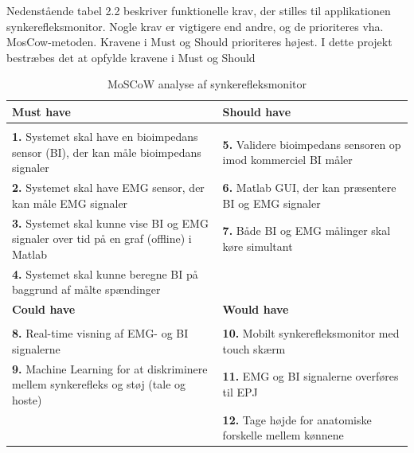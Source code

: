 Nedenstående tabel 2.2 beskriver funktionelle krav, der stilles til applikationen synkerefleksmonitor. Nogle krav er vigtigere end andre, og de prioriteres vha. MosCow-metoden. Kravene i Must og Should prioriteres højest. I dette projekt bestræbes det at opfylde kravene i Must og Should


\begin{table}[H]

\begin{tabularx}{\textwidth}{X|X}
\rowcolor{Gray}
\toprule
\textbf{Must have} & \textbf{Should have} \\
\hline \\
\textbf{1. }Systemet skal have en bioimpedans sensor (BI), der kan måle bioimpedans signaler & \textbf{5. }Validere bioimpedans sensoren op imod kommerciel BI måler \\[5ex]
\textbf{2. }Systemet skal have EMG sensor, der kan måle EMG signaler & \textbf{6. }Matlab GUI, der kan præsentere BI og EMG signaler \\[3ex]
\textbf{3. }Systemet skal kunne vise BI og EMG signaler over tid på en graf (offline) i Matlab  & \textbf{7. }Både BI og EMG målinger skal køre simultant\\[4ex]
\textbf{4. }Systemet skal kunne beregne BI på baggrund af målte spændinger & \\[4ex]


\midrule
    \rowcolor{Gray}
    \textbf{Could have} & \textbf{Would have}\\
    \midrule \\
\textbf{8. }Real-time visning af EMG- og BI signalerne & \textbf{10. }Mobilt synkerefleksmonitor med touch skærm\\[4ex]
\textbf{9. }Machine Learning for at diskriminere mellem synkerefleks og støj (tale og hoste)& \textbf{11. }EMG og BI signalerne overføres til EPJ  \\[4ex]
& \textbf{12. }Tage højde for anatomiske forskelle mellem kønnene\\[4ex]

\end{tabularx}

\caption{MoSCoW analyse af synkerefleksmonitor}
  \label{tab:moscow}
\end{table}




